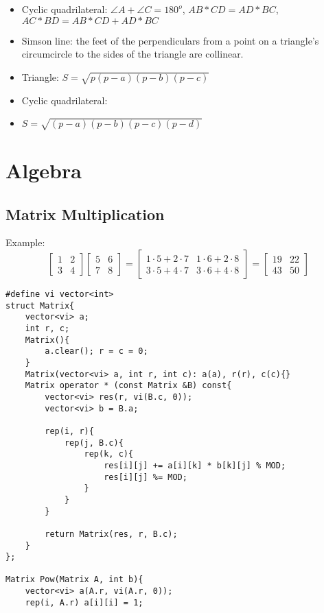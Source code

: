 \documentclass[11pt,a4paper]{article}
\begin{document}
\begin{multicols*}{2}
\begin{itemize}
    \item Cyclic quadrilateral: $\angle A + \angle C = 180^o$, $AB * CD = AD * BC$, $AC * BD = AB * CD + AD * BC$
    \item Simson line: the feet of the perpendiculars from a point on a triangle's circumcircle to the sides of the triangle are collinear.
    \item Triangle: $S = \sqrt{p(p - a)(p - b)(p - c)}$
    \item Cyclic quadrilateral: 
    \item $S = \sqrt{(p - a)(p - b)(p - c)(p - d)}$
\end{itemize}



\section{Algebra}
\subsection{Matrix Multiplication}

Example:
\[
\begin{bmatrix}
1 & 2 \\
3 & 4
\end{bmatrix}
\begin{bmatrix}
5 & 6 \\
7 & 8
\end{bmatrix}
=
\begin{bmatrix}
1\cdot 5 + 2\cdot 7 & 1\cdot 6 + 2\cdot 8 \\
3\cdot 5 + 4\cdot 7 & 3\cdot 6 + 4\cdot 8
\end{bmatrix}
=
\begin{bmatrix}
19 & 22 \\
43 & 50
\end{bmatrix}
\]

\begin{lstlisting}
#define vi vector<int>
struct Matrix{
	vector<vi> a;
	int r, c;
	Matrix(){
		a.clear(); r = c = 0;
	}
	Matrix(vector<vi> a, int r, int c): a(a), r(r), c(c){}
	Matrix operator * (const Matrix &B) const{
		vector<vi> res(r, vi(B.c, 0));
		vector<vi> b = B.a;
		
		rep(i, r){
			rep(j, B.c){
				rep(k, c){
					res[i][j] += a[i][k] * b[k][j] % MOD;
					res[i][j] %= MOD; 
				}
			}
		}
		
		return Matrix(res, r, B.c);
	}
};

Matrix Pow(Matrix A, int b){
	vector<vi> a(A.r, vi(A.r, 0));
	rep(i, A.r) a[i][i] = 1;
	

\end{lstlisting}
\end{multicols*}
\end{document}
